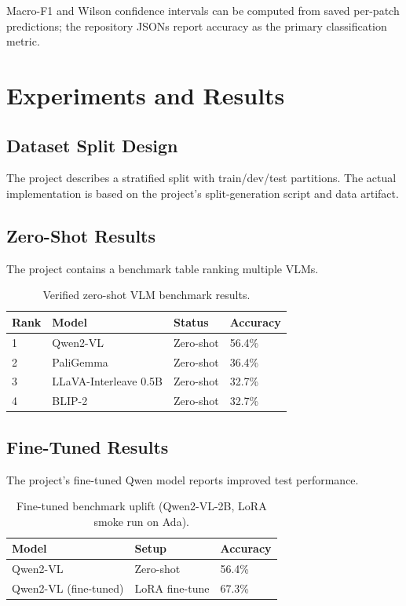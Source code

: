\documentclass[11pt]{article}
\begin{document}
Macro-F1 and Wilson confidence intervals can be computed from saved per-patch predictions; the repository JSONs report accuracy as the primary classification metric.

\section{Experiments and Results}

\subsection{Dataset Split Design}
The project describes a stratified split with train/dev/test partitions. The actual implementation is based on the project’s split-generation script and data artifact.

\subsection{Zero-Shot Results}
The project contains a benchmark table ranking multiple VLMs.

\begin{table}[H]
\centering
\renewcommand{\arraystretch}{1.2}
\begin{tabular}{p{2cm} p{4cm} p{3cm} p{2.2cm}}
\toprule
\textbf{Rank} & \textbf{Model} & \textbf{Status} & \textbf{Accuracy} \\
\midrule
1 & Qwen2-VL & Zero-shot & 56.4\% \\
2 & PaliGemma & Zero-shot & 36.4\% \\
3 & LLaVA-Interleave 0.5B & Zero-shot & 32.7\% \\
4 & BLIP-2 & Zero-shot & 32.7\% \\
\bottomrule
\end{tabular}
\caption{Verified zero-shot VLM benchmark results.}
\end{table}

\subsection{Fine-Tuned Results}
The project’s fine-tuned Qwen model reports improved test performance.

\begin{table}[H]
\centering
\renewcommand{\arraystretch}{1.2}
\begin{tabular}{p{4cm} p{4cm} p{2.5cm}}
\toprule
\textbf{Model} & \textbf{Setup} & \textbf{Accuracy} \\
\midrule
Qwen2-VL & Zero-shot & 56.4\% \\
Qwen2-VL (fine-tuned) & LoRA fine-tune & 67.3\% \\
\bottomrule
\end{tabular}
\caption{Fine-tuned benchmark uplift (Qwen2-VL-2B, LoRA smoke run on Ada).}
\end{table}
\end{document}
